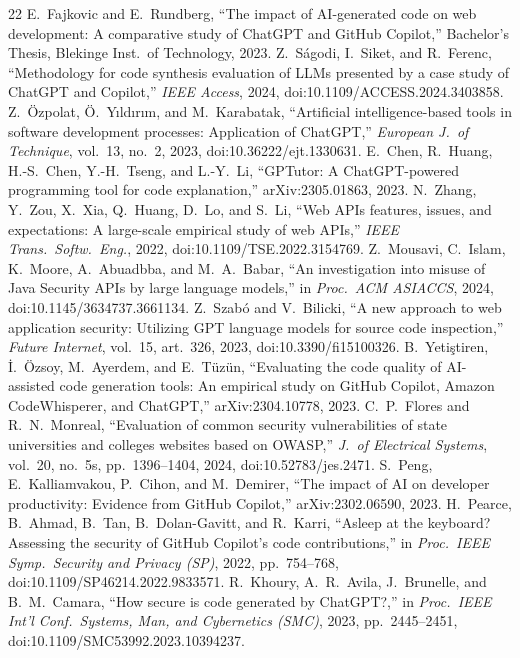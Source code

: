 \documentclass[conference,letterpaper]{IEEEtran}
\begin{document}
\begin{thebibliography}{22}
 E.~Fajkovic and E.~Rundberg, ``The impact of AI-generated code on web development: A comparative study of ChatGPT and GitHub Copilot,'' Bachelor's Thesis, Blekinge Inst.\ of Technology, 2023.
 Z.~S\'agodi, I.~Siket, and R.~Ferenc, ``Methodology for code synthesis evaluation of LLMs presented by a case study of ChatGPT and Copilot,'' \emph{IEEE Access}, 2024, doi:10.1109/ACCESS.2024.3403858.
 Z.~\"Ozpolat, \"O.~Y\i ld\i r\i m, and M.~Karabatak, ``Artificial intelligence-based tools in software development processes: Application of ChatGPT,'' \emph{European J.\ of Technique}, vol.~13, no.~2, 2023, doi:10.36222/ejt.1330631.
 E.~Chen, R.~Huang, H.-S.~Chen, Y.-H.~Tseng, and L.-Y.~Li, ``GPTutor: A ChatGPT-powered programming tool for code explanation,'' arXiv:2305.01863, 2023.
 N.~Zhang, Y.~Zou, X.~Xia, Q.~Huang, D.~Lo, and S.~Li, ``Web APIs features, issues, and expectations: A large-scale empirical study of web APIs,'' \emph{IEEE Trans.\ Softw.\ Eng.}, 2022, doi:10.1109/TSE.2022.3154769.
 Z.~Mousavi, C.~Islam, K.~Moore, A.~Abuadbba, and M.~A.~Babar, ``An investigation into misuse of Java Security APIs by large language models,'' in \emph{Proc.\ ACM ASIACCS}, 2024, doi:10.1145/3634737.3661134.
 Z.~Szab\'o and V.~Bilicki, ``A new approach to web application security: Utilizing GPT language models for source code inspection,'' \emph{Future Internet}, vol.~15, art.~326, 2023, doi:10.3390/fi15100326.
 B.~Yeti\c stiren, \.I.~\"Ozsoy, M.~Ayerdem, and E.~T\"uz\"un, ``Evaluating the code quality of AI-assisted code generation tools: An empirical study on GitHub Copilot, Amazon CodeWhisperer, and ChatGPT,'' arXiv:2304.10778, 2023.
 C.~P.~Flores and R.~N.~Monreal, ``Evaluation of common security vulnerabilities of state universities and colleges websites based on OWASP,'' \emph{J.\ of Electrical Systems}, vol.~20, no.~5s, pp.~1396--1404, 2024, doi:10.52783/jes.2471.
 S.~Peng, E.~Kalliamvakou, P.~Cihon, and M.~Demirer, ``The impact of AI on developer productivity: Evidence from GitHub Copilot,'' arXiv:2302.06590, 2023.
 H.~Pearce, B.~Ahmad, B.~Tan, B.~Dolan-Gavitt, and R.~Karri, ``Asleep at the keyboard? Assessing the security of GitHub Copilot's code contributions,'' in \emph{Proc.\ IEEE Symp.\ Security and Privacy (SP)}, 2022, pp.~754--768, doi:10.1109/SP46214.2022.9833571.
 R.~Khoury, A.~R.~Avila, J.~Brunelle, and B.~M.~Camara, ``How secure is code generated by ChatGPT?,'' in \emph{Proc.\ IEEE Int'l Conf.\ Systems, Man, and Cybernetics (SMC)}, 2023, pp.~2445--2451, doi:10.1109/SMC53992.2023.10394237.

\end{thebibliography}
\end{document}
